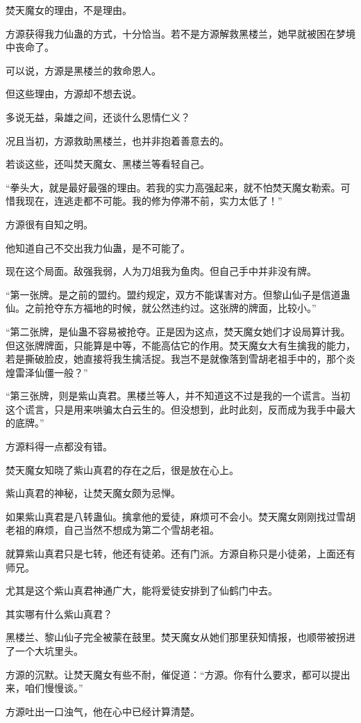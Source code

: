 \begin{this_body}
焚天魔女的理由，不是理由。

方源获得我力仙蛊的方式，十分恰当。若不是方源解救黑楼兰，她早就被困在梦境中丧命了。

可以说，方源是黑楼兰的救命恩人。

但这些理由，方源却不想去说。

多说无益，枭雄之间，还谈什么恩情仁义？

况且当初，方源救助黑楼兰，也并非抱着善意去的。

若谈这些，还叫焚天魔女、黑楼兰等看轻自己。

“拳头大，就是最好最强的理由。若我的实力高强起来，就不怕焚天魔女勒索。可惜我现在，连逃走都不可能。我的修为停滞不前，实力太低了！”

方源很有自知之明。

他知道自己不交出我力仙蛊，是不可能了。

现在这个局面。敌强我弱，人为刀俎我为鱼肉。但自己手中并非没有牌。

“第一张牌。是之前的盟约。盟约规定，双方不能谋害对方。但黎山仙子是信道蛊仙。之前抢夺东方福地的时候，就公然违约过。这张牌的牌面，比较小。”

“第二张牌，是仙蛊不容易被抢夺。正是因为这点，焚天魔女她们才设局算计我。但这张牌牌面，只能算是中等，不能高估它的作用。焚天魔女大有生擒我的能力，若是撕破脸皮，她直接将我生擒活捉。我岂不是就像落到雪胡老祖手中的，那个炎煌雷泽仙僵一般？”

“第三张牌，则是紫山真君。黑楼兰等人，并不知道这不过是我的一个谎言。当初这个谎言，只是用来哄骗太白云生的。但没想到，此时此刻，反而成为我手中最大的底牌。”

方源料得一点都没有错。

焚天魔女知晓了紫山真君的存在之后，很是放在心上。

紫山真君的神秘，让焚天魔女颇为忌惮。

如果紫山真君是八转蛊仙。擒拿他的爱徒，麻烦可不会小。焚天魔女刚刚找过雪胡老祖的麻烦，自己当然不想成为第二个雪胡老祖。

就算紫山真君只是七转，他还有徒弟。还有门派。方源自称只是小徒弟，上面还有师兄。

尤其是这个紫山真君神通广大，能将爱徒安排到了仙鹤门中去。

其实哪有什么紫山真君？

黑楼兰、黎山仙子完全被蒙在鼓里。焚天魔女从她们那里获知情报，也顺带被拐进了一个大坑里头。

方源的沉默。让焚天魔女有些不耐，催促道：“方源。你有什么要求，都可以提出来，咱们慢慢谈。”

方源吐出一口浊气，他在心中已经计算清楚。


\end{this_body}
